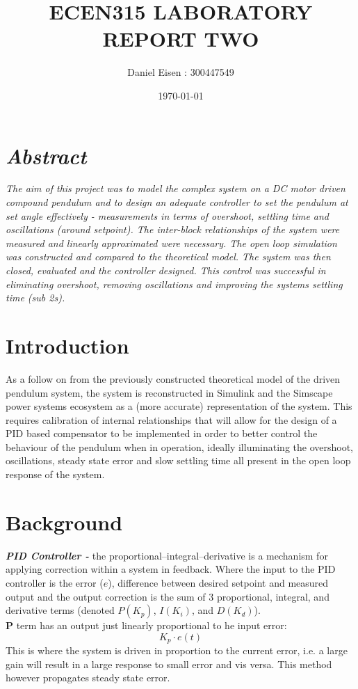 \documentclass[a4paper,11pt]{article}
\title{ECEN315 LABORATORY REPORT TWO}
\author{Daniel Eisen : 300447549}
\date{\today}
\begin{document}
\maketitle
\section*{\small{\textit{Abstract}}}
\small{\textit{The aim of this project was to model the complex system on a DC motor driven compound pendulum and to design an adequate controller to set the pendulum at set angle effectively - measurements in terms of overshoot, settling time and oscillations (around setpoint).
The inter-block relationships of the system were measured and linearly approximated were necessary.
The open loop simulation was constructed and compared to the theoretical model.
The system was then closed, evaluated and the controller designed. This control was successful in eliminating overshoot, removing oscillations and improving the systems settling time (sub 2s).}}

\section{Introduction}
As a follow on from the previously constructed theoretical model of the driven pendulum system, the system is reconstructed in Simulink and the Simscape power systems ecosystem as a (more accurate) representation of the system. This requires calibration of internal relationships that will allow for the design of a PID based compensator to be implemented in order to better control the behaviour of the pendulum when in operation, ideally illuminating the overshoot, oscillations, steady state error and slow settling time all present in the open loop response of the system.

\section{Background}
\textit{\textbf{PID Controller - }} the proportional–integral–derivative is a mechanism for applying correction within a system in feedback. Where the input to the PID controller is the error ($e$), difference between desired setpoint and measured output and the output correction is the sum of 3 proportional, integral, and derivative terms (denoted $P (K_p)$, $I (K_i)$, and $D (K_d)$).\\

\textbf{P} term has an output just linearly proportional to he input error:
$$K_p \cdot e(t)$$
This is where the system is driven in proportion to the current error, i.e. a large gain will result in a large response to small error and vis versa. This method however propagates steady state error.
\end{document}
